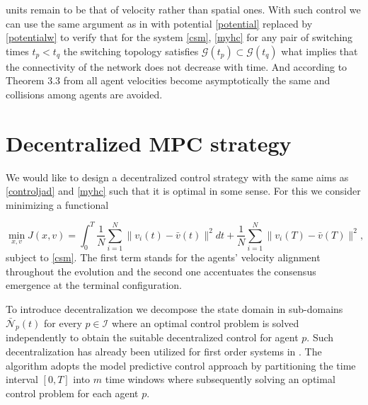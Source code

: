 \documentclass[a4paper, english]{article}
\begin{document}
units remain to be that of velocity rather than spatial ones. With such control we can use the same argument as in \cite{jfwpc} with potential \eqref{potential} replaced by \eqref{potentialw}  to verify that for the system \eqref{csm}, \eqref{myhc}
for any pair of switching times $t_p < t_q$ the switching topology satisfies $\mathcal{G}(t_p) \subset \mathcal{G}(t_q)$ what implies that the connectivity of the network does not decrease with time.
And according to Theorem 3.3 from \cite{jfwpc} all agent velocities become asymptotically the same and collisions among agents are avoided.

































\section{Decentralized MPC strategy}
  We would like to design a decentralized control strategy with the same aims as \eqref{controljad} and \eqref{myhc} such that it is optimal in some sense. For this we consider minimizing a functional

  \begin{equation}
  \min_{x, v} J(x, v) = \int_{0}^{T}\frac{1}{N}\sum_{i=1}^{N}\|v_i(t) - \bar{v}(t)\|^2 dt + \frac{1}{N}\sum_{i=1}^{N}\|v_i(T) - \bar{v}(T)\|^2,
 \label{j}
 \end{equation}
 subject to \eqref{csm}. The first term stands for the agents' velocity alignment throughout the evolution and the second one accentuates the consensus emergence at the terminal configuration.

 To introduce decentralization we decompose the state domain in sub-domains $\bar{\mathcal{N}}_p(t)$ for every $p\in \mathcal{I}$ where an optimal control problem is solved independently to obtain the suitable decentralized control for agent $p$. Such decentralization has already been utilized for first order systems in \cite{jdccms}.
 The algorithm adopts the model predictive control approach by partitioning the time interval $[0, T]$ into $m$ time windows where subsequently solving an optimal control problem for each agent $p$.
\end{document}
